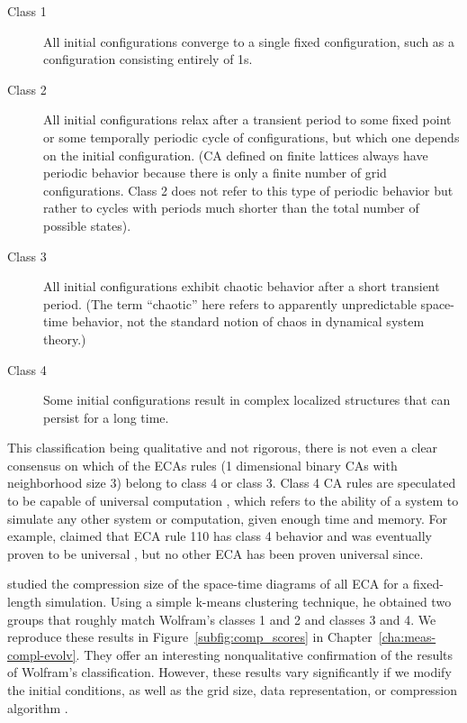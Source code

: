 \begin{description}
  \item[Class 1] All initial configurations converge to a single fixed configuration, such as a configuration consisting entirely of 1s.
  \item[Class 2] All initial configurations relax after a transient period to some
        fixed point or some temporally periodic cycle of configurations, but
        which one depends on the initial configuration. (\ac{CA} defined on
        finite lattices always have periodic behavior because there
        is only a finite number of grid configurations. Class 2 does not refer to
        this type of periodic behavior but rather to cycles with periods much
        shorter than the total number of possible states).
  \item[Class 3] All initial configurations exhibit chaotic behavior
        after a short transient period. (The term “chaotic” here refers to
        apparently unpredictable space-time behavior, not the standard notion 
        of chaos in dynamical system theory.)
  \item[Class 4] Some initial configurations result in complex localized
        structures that can persist for a long time.
\end{description}

This classification being qualitative and not rigorous, there is not even a
clear consensus on which of the \acp{ECA} rules (1 dimensional binary \acp{CA} with neighborhood size 3) belong to class 4 or class 3.
Class 4 \ac{CA} rules are speculated to be capable of universal computation
\parencite{wolframUniversalityComplexityCellular1984}, which refers to the ability of a system to simulate any other system or computation, given enough time and memory. For example,
\textcite{liStructureElementaryCellular1990} claimed that \ac{ECA} rule 110 has
class 4 behavior and was eventually proven to be universal
\parencite{cookUniversalityElementaryCellular2004}, but no other \ac{ECA} has
been proven universal since.

\textcite{zenilCompressionBasedInvestigationDynamical2010} studied the
compression size of the space-time diagrams of all \ac{ECA} for a fixed-length
simulation. Using a simple k-means clustering technique, he obtained two groups
that roughly match Wolfram’s classes 1 and 2 and classes 3 and 4. We reproduce
these results in Figure~\ref{subfig:comp_scores} in Chapter~\ref{cha:meas-compl-evolv}.
They offer an interesting
nonqualitative confirmation of the results of Wolfram's classification.
However, these results vary significantly if we modify the initial conditions, as
well as the grid size, data representation, or compression algorithm
\parencite{hudcovaClassificationComplexSystems2020}.

